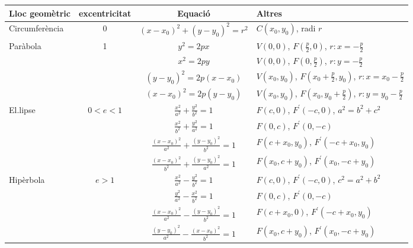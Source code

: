 \documentclass[a4paper,landscape]{article}
\begin{document}
	\author{Mireia Dosil}
	\date{text}


 
 
\begin{center}
	\begin{tabular}{ | l | c | c | l |}
		\hline
		Lloc geomètric & excentricitat & Equació & Altres \\ \hline
		Circumferència & 0 & $(x-x_0)^2+(y-y_0)^2=r^2$ & $C(x_0,y_0)$, radi $r$ \\
		\hline
		\multirow{4}{*}{Paràbola} & \multirow{4}{*}{1} & $y^2=2px$ & $V(0,0)$, $F(\frac{p}{2},0)$, $r:x=-\frac{p}{2}$ \\ \cline{3-4}
		& &  $x^2=2py$ & $V(0,0)$, $F(0,\frac{p}{2})$, $r:y=-\frac{p}{2}$  \\ \cline{3-4}
		& &  $(y-y_0)^2=2p(x-x_0)$ & $V(x_0,y_0)$, $F(x_0+\frac{p}{2},y_0)$, $r:x=x_0-\frac{p}{2}$  \\ \cline{3-4}
		& &  $(x-x_0)^2=2p(y-y_0)$ & $V(x_0,y_0)$, $F(x_0,y_0+\frac{p}{2})$, $r:y=y_0-\frac{p}{2}$  \\ \cline{3-4}
		\hline
		\multirow{4}{*}{El.lipse} & \multirow{4}{*}{$0<e<1$} & $\frac{x^2}{a^2}+\frac{y^2}{b^2}=1$ & $F(c,0)$, $F^\prime(-c,0)$, $a^2=b^2+c^2$  \\ \cline{3-4}
		& & $\frac{x^2}{b^2}+\frac{y^2}{a^2}=1$ & $F(0,c)$, $F^\prime(0,-c)$  \\ \cline{3-4}
		& & $\frac{(x-x_0)^2}{a^2}+\frac{(y-y_0)^2}{b^2}=1$ & $F(c+x_0,y_0)$, $F^\prime(-c+x_0,y_0)$\\ \cline{3-4}
		& & $\frac{(x-x_0)^2}{b^2}+\frac{(y-y_0)^2}{a^2}=1$ & $F(x_0,c+y_0)$, $F^\prime(x_0,-c+y_0)$  \\ \cline{3-4}
		\hline
		\multirow{4}{*}{Hipèrbola} & \multirow{4}{*}{$e>1$} & $\frac{x^2}{a^2}-\frac{y^2}{b^2}=1$ & $F(c,0)$, $F^\prime(-c,0)$, $c^2=a^2+b^2$  \\ \cline{3-4}
		& & $\frac{y^2}{a^2}-\frac{x^2}{b^2}=1$ & $F(0,c)$, $F^\prime(0,-c)$  \\ \cline{3-4}
		& & $\frac{(x-x_0)^2}{a^2}-\frac{(y-y_0)^2}{b^2}=1$ & $F(c+x_0,0)$, $F^\prime(-c+x_0,y_0)$\\ \cline{3-4}
		& & $\frac{(y-y_0)^2}{a^2}-\frac{(x-x_0)^2}{b^2}=1$ & $F(x_0,c+y_0)$, $F^\prime(x_0,-c+y_0)$  \\ \cline{3-4}
		\hline
	\end{tabular}
\end{center}
\end{document}
